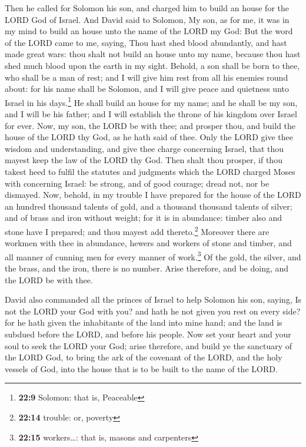  Then he called for Solomon his son, and charged him to
build an house for the LORD God of Israel.  And David said
to Solomon, My son, as for me, it was in my mind to build an house unto
the name of the LORD my God:  But the word of the LORD
came to me, saying, Thou hast shed blood abundantly, and hast made great
wars: thou shalt not build an house unto my name, because thou hast shed
much blood upon the earth in my sight.  Behold, a son
shall be born to thee, who shall be a man of rest; and I will give him
rest from all his enemies round about: for his name shall be Solomon,
and I will give peace and quietness unto Israel in his days.\footnote{\textbf{22:9}
  Solomon: that is, Peaceable}  He shall build an house
for my name; and he shall be my son, and I will be his father; and I
will establish the throne of his kingdom over Israel for ever.
 Now, my son, the LORD be with thee; and prosper thou,
and build the house of the LORD thy God, as he hath said of thee.
 Only the LORD give thee wisdom and understanding, and
give thee charge concerning Israel, that thou mayest keep the law of the
LORD thy God.  Then shalt thou prosper, if thou takest
heed to fulfil the statutes and judgments which the LORD charged Moses
with concerning Israel: be strong, and of good courage; dread not, nor
be dismayed.  Now, behold, in my trouble I have prepared
for the house of the LORD an hundred thousand talents of gold, and a
thousand thousand talents of silver; and of brass and iron without
weight; for it is in abundance: timber also and stone have I prepared;
and thou mayest add thereto.\footnote{\textbf{22:14} trouble: or,
  poverty}  Moreover there are workmen with thee in
abundance, hewers and workers of stone and timber, and all manner of
cunning men for every manner of work.\footnote{\textbf{22:15}
  workers\ldots: that is, masons and carpenters}  Of the
gold, the silver, and the brass, and the iron, there is no number. Arise
therefore, and be doing, and the LORD be with thee.

 David also commanded all the princes of Israel to help
Solomon his son, saying,  Is not the LORD your God with
you? and hath he not given you rest on every side? for he hath given the
inhabitants of the land into mine hand; and the land is subdued before
the LORD, and before his people.  Now set your heart and
your soul to seek the LORD your God; arise therefore, and build ye the
sanctuary of the LORD God, to bring the ark of the covenant of the LORD,
and the holy vessels of God, into the house that is to be built to the
name of the LORD.

